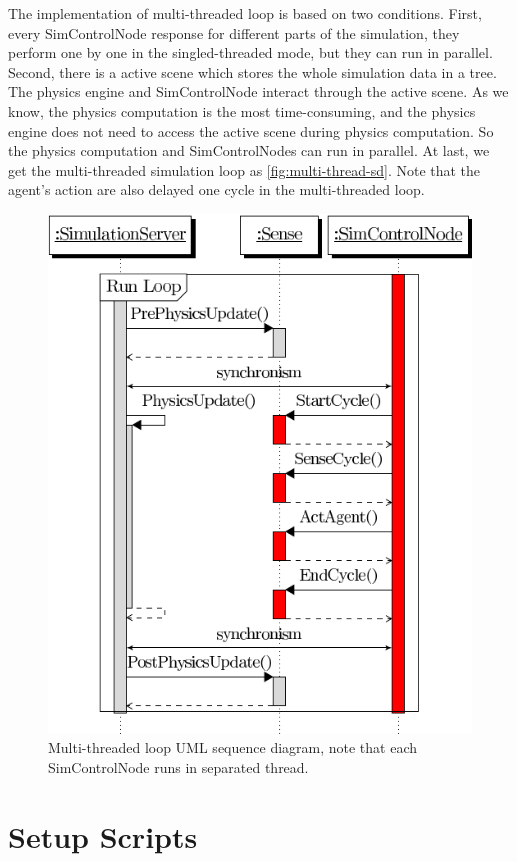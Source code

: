 The implementation of multi-threaded loop is based on two conditions.
First, every SimControlNode response for different parts of the
simulation, they perform one by one in the singled-threaded mode, but
they can run in parallel. Second, there is a active scene which stores
the whole simulation data in a tree. The physics engine and
SimControlNode interact through the active scene. As we know, the
physics computation is the most time-consuming, and the physics engine
does not need to access the active scene during physics computation.
So the physics computation and SimControlNodes can run in parallel. At
last, we get the multi-threaded simulation loop as
\autoref{fig:multi-thread-sd}. Note that the agent's action are also
delayed one cycle in the multi-threaded loop.
\begin{figure}[htp]
  \centering
  \includegraphics[height=0.5\textheight]{fig/serverMultiThreadLoop}
  \caption{Multi-threaded loop UML sequence diagram, note that
    each SimControlNode runs in separated thread.}
  \label{fig:multi-thread-sd}
\end{figure}

\section{Setup Scripts}



